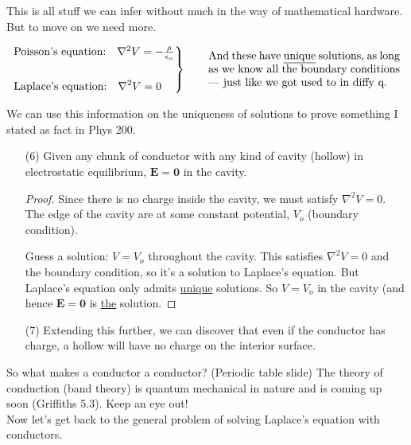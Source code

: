 \documentclass{article}
\numberwithin{equation}{section}
\begin{document}
This is all stuff we can infer without much in the way of mathematical hardware. But to move on we need more.

\begin{equation*}
    \begin{rcases} \text{Poisson's equation:} \quad \nabla^2 V = -\frac{\rho}{\epsilon_o} \\[0.5cm] \displaystyle \text{Laplace's equation:} \quad \nabla^2 V = 0 \end{rcases} \qquad \parbox[c]{0.5\textwidth}{And these have \underline{unique} solutions, as long as we know all the boundary conditions --- just like we got used to in diffy q.}
\end{equation*}

We can use this information on the uniqueness of solutions to prove something I stated as fact in Phys 200.

\begin{enumerate}

\item[(6)] Given any chunk of conductor with any kind of cavity (hollow) in electrostatic equilibrium, $\bm{E} = \bm{0}$ in the cavity.

\begin{proof}

Since there is no charge inside the cavity, we must satisfy $\displaystyle \nabla^2 V = 0$. The edge of the cavity are at some constant potential, $V_o$ (boundary condition).

Guess a solution: $V = V_o$ throughout the cavity. This satisfies $\displaystyle \nabla^2 V = 0$ and the boundary condition, so it's a solution to Laplace's equation. But Laplace's equation only admits \underline{unique} solutions. So $V = V_o$ in the cavity (and hence $\bm{E} = \bm{0}$ is \underline{the} solution.

\end{proof}

\item[(7)] Extending this further, we can discover that even if the conductor has charge, a hollow will have no charge on the interior surface.

\end{enumerate}

So what makes a conductor a conductor? (Periodic table slide) The theory of conduction (band theory) is quantum mechanical in nature and is coming up soon (Griffiths 5.3). Keep an eye out! \\

Now let's get back to the general problem of solving Laplace's equation with conductors. \\
\end{document}
